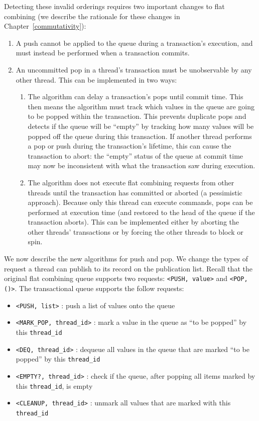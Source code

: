 Detecting these invalid orderings requires two important changes to flat combining (we describe the rationale for these changes in Chapter~\ref{commutativity}): 
\begin{enumerate}
\item A push cannot be applied to the queue during a transaction's execution, and must instead be performed when a transaction commits.
\item An uncommitted pop in a thread's transaction must be unobservable by any other thread. This can be implemented in two ways:  
    \begin{enumerate}
        \item The algorithm can delay a transaction's pops until commit time. This then means the algorithm must track which values in the queue are going to be popped within the transaction. This prevents duplicate pops and detects if the queue will be ``empty'' by tracking how many values will be popped off the queue during this transaction. If another thread performs a pop or push during the transaction's lifetime, this can cause the transaction to abort: the ``empty'' status of the queue at commit time may now be inconsistent with what the transaction saw during execution. 
        \item The algorithm does not execute flat combining requests from other threads until the transaction has committed or aborted (a pessimistic approach). Because only this thread can execute commands, pops can be performed at execution time (and restored to the head of the queue if the transaction aborts). This can be implemented either by aborting the other threads' transactions or by forcing the other threads to block or spin.
    \end{enumerate}
\end{enumerate}

We now describe the new algorithms for push and pop.  We change the types of request a thread can publish to its record on the publication list. Recall that the original flat combining queue supports two requests: \texttt{<PUSH, value>} and \texttt{<POP, ()>}. The transactional queue supports the follow requests:
\begin{itemize}
    \item \texttt{<PUSH, list>} : push a list of values onto the queue
    \item \texttt{<MARK\_POP, thread\_id>} : mark a value in the queue as ``to be popped'' by this \texttt{thread\_id}
    \item \texttt{<DEQ, thread\_id>} : dequeue all values in the queue that are marked ``to be popped'' by this \texttt{thread\_id}
    \item \texttt{<EMPTY?, thread\_id>} : check if the queue, after popping all items marked by this \texttt{thread\_id}, is empty
    \item \texttt{<CLEANUP, thread\_id>} : unmark all values that are marked with this \texttt{thread\_id}
\end{itemize}

